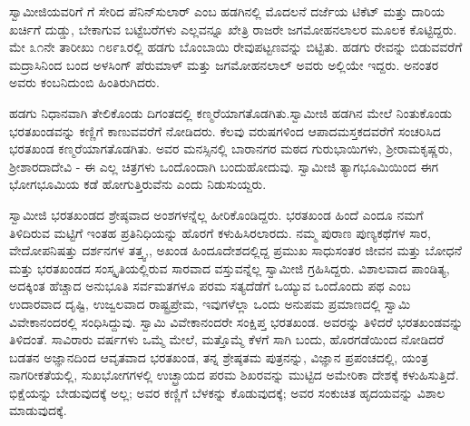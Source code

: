  ಸ್ವಾಮೀಜಿಯವರಿಗೆ  ಗೆ ಸೇರಿದ ಪೆನಿನ್​ಸುಲಾರ್ ಎಂಬ ಹಡಗಿನಲ್ಲಿ ಮೊದಲನೆ ದರ್ಜೆಯ ಟಿಕೆಟ್ ಮತ್ತು ದಾರಿಯ ಖರ್ಚಿಗೆ ದುಡ್ಡು, ಬೇಕಾಗುವ ಬಟ್ಟೆಬರೆಗಳು ಎಲ್ಲವನ್ನೂ ಖೇತ್ರಿ ರಾಜರೇ ಜಗಮೋಹನಲಾಲರ ಮೂಲಕ ಕೊಟ್ಟಿದ್ದರು. ಮೇ ೩೧ನೇ ತಾರೀಖು ೧೮೯೩ರಲ್ಲಿ ಹಡಗು ಬೊಂಬಾಯಿ ರೇವುಪಟ್ಟಣವನ್ನು ಬಿಟ್ಟಿತು. ಹಡಗು ರೇವನ್ನು ಬಿಡುವವರೆಗೆ ಮದ್ರಾಸಿನಿಂದ ಬಂದ ಅಳಸಿಂಗ್ ಪೆರುಮಾಳ್ ಮತ್ತು ಜಗಮೋಹನಲಾಲ್ ಅವರು ಅಲ್ಲಿಯೇ ಇದ್ದರು. ಅನಂತರ ಅವರು ಕಂಬನಿದುಂಬಿ ಹಿಂತಿರುಗಿದರು. 

 ಹಡಗು ನಿಧಾನವಾಗಿ ತೇಲಿಕೊಂಡು ದಿಗಂತದಲ್ಲಿ ಕಣ್ಮರೆಯಾಗತೊಡಗಿತು.\break ಸ್ವಾಮೀಜಿ ಹಡಗಿನ ಮೇಲೆ ನಿಂತುಕೊಂಡು ಭರತಖಂಡವನ್ನು ಕಣ್ಣಿಗೆ ಕಾಣುವವರೆಗೆ ನೋಡಿದರು. ಕೆಲವು ವರುಷಗಳಿಂದ ಆಪಾದಮಸ್ತಕದವರೆಗೆ ಸಂಚರಿಸಿದ ಭರತಖಂಡ ಕಣ್ಮರೆಯಾಗತೊಡಗಿತು. ಅವರ ಮನಸ್ಸಿನಲ್ಲಿ ಬಾರಾನಗರ ಮಠದ ಗುರುಭಾಯಿಗಳು, ಶ‍್ರೀರಾಮಕೃಷ್ಣರು, ಶ‍್ರೀಶಾರದಾದೇವಿ - ಈ ಎಲ್ಲ ಚಿತ್ರಗಳು ಒಂದೊಂದಾಗಿ ಬಂದುಹೋದುವು. ಸ್ವಾಮೀಜಿ ತ್ಯಾಗಭೂಮಿಯಿಂದ ಈಗ ಭೋಗಭೂಮಿಯ ಕಡೆ ಹೋಗುತ್ತಿರುವೆನು ಎಂದು ನಿಡುಸುಯ್ದರು. 

 ಸ್ವಾಮೀಜಿ ಭರತಖಂಡದ ಶ್ರೇಷ್ಠವಾದ ಅಂಶಗಳನ್ನೆಲ್ಲ ಹೀರಿಕೊಂಡಿದ್ದರು. ಭರತಖಂಡ ಹಿಂದೆ ಎಂದೂ ನಮಗೆ ತಿಳಿದಿರುವ ಮಟ್ಟಿಗೆ ಇಂತಹ ಪ್ರತಿನಿಧಿಯನ್ನು ಹೊರಗೆ ಕಳುಹಿಸಿರಲಾರದು. ನಮ್ಮ ಪುರಾಣ ಪುಣ್ಯಕಥೆಗಳ ಸಾರ, ವೇದೋಪನಿಷತ್ತು ದರ್ಶನಗಳ ತತ್ತ್ವ,, ಅಖಂಡ ಹಿಂದೂದೇಶದಲ್ಲಿದ್ದ ಪ್ರಮುಖ ಸಾಧುಸಂತರ ಜೀವನ ಮತ್ತು ಬೋಧನೆ ಮತ್ತು ಭರತಖಂಡದ ಸಂಸ್ಕೃತಿಯಲ್ಲಿರುವ ಸಾರವಾದ ವಸ್ತುವನ್ನೆಲ್ಲ ಸ್ವಾಮೀಜಿ ಗ್ರಹಿಸಿದ್ದರು. ವಿಶಾಲವಾದ ಪಾಂಡಿತ್ಯ, ಅದಕ್ಕಿಂತ ಹೆಚ್ಚಾದ ಅನುಭೂತಿ ಸರ್ವಮತಗಳೂ ಪರಮ ಸತ್ಯದೆಡೆಗೆ ಒಯ್ಯುವ ಒಂದೊಂದು ಪಥ ಎಂಬ ಉದಾರವಾದ ದೃಷ್ಟಿ, ಉಜ್ವಲವಾದ ರಾಷ್ಟ್ರಪ್ರೇಮ, ಇವುಗಳೆಲ್ಲಾ ಒಂದು ಅನುಪಮ ಪ್ರಮಾಣದಲ್ಲಿ ಸ್ವಾಮಿ ವಿವೇಕಾನಂದರಲ್ಲಿ ಸಂಧಿಸಿದ್ದುವು. ಸ್ವಾಮಿ ವಿವೇಕಾನಂದರೇ ಸಂಕ್ಷಿಪ್ತ ಭರತಖಂಡ. ಅವರನ್ನು ತಿಳಿದರೆ ಭರತಖಂಡವನ್ನು ತಿಳಿದಂತೆ. ಸಾವಿರಾರು ವರ್ಷಗಳು ಒಮ್ಮೆ ಮೇಲೆ, ಮತ್ತೊಮ್ಮೆ ಕೆಳಗೆ ಸಾಗಿ ಬಂದು, ಹೊರಗಡೆಯಿಂದ ನೋಡಿದರೆ ಬಡತನ ಅಜ್ಞಾನದಿಂದ ಆವೃತವಾದ ಭರತಖಂಡ, ತನ್ನ ಶ್ರೇಷ್ಠತಮ ಪುತ್ರನನ್ನು, ವಿಜ್ಞಾನ ಪ್ರಪಂಚದಲ್ಲಿ, ಯಂತ್ರ ನಾಗರೀಕತೆಯಲ್ಲಿ, ಸುಖಭೋಗಗಳಲ್ಲಿ ಉಚ್ಛ್ರಾಯದ ಪರಮ ಶಿಖರವನ್ನು ಮುಟ್ಟಿದ ಅಮೇರಿಕಾ ದೇಶಕ್ಕೆ ಕಳುಹಿಸುತ್ತಿದೆ. ಭಿಕ್ಷೆಯನ್ನು ಬೇಡುವುದಕ್ಕೆ ಅಲ್ಲ; ಅವರ ಕಣ್ಣಿಗೆ ಬೆಳಕನ್ನು ಕೊಡುವುದಕ್ಕೆ; ಅವರ ಸಂಕುಚಿತ ಹೃದಯವನ್ನು ವಿಶಾಲ ಮಾಡುವುದಕ್ಕೆ. 

